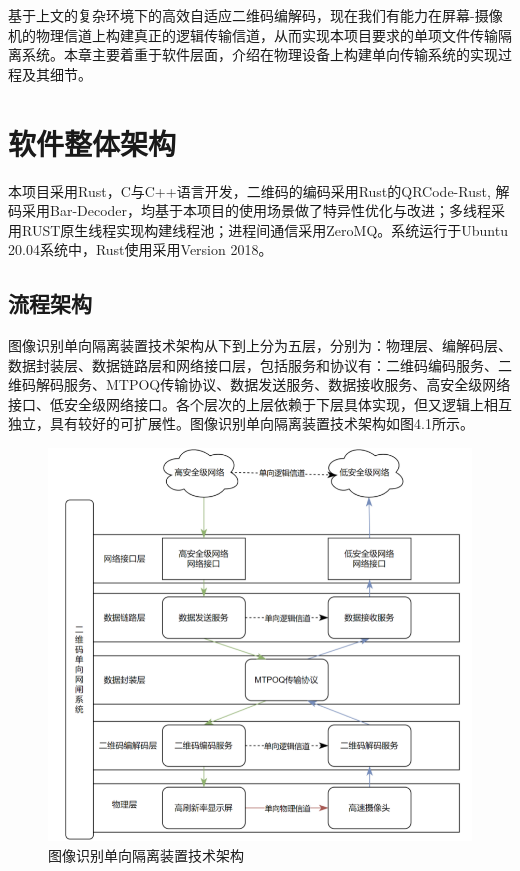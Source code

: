 \label{cha:sys}

基于上文的复杂环境下的高效自适应二维码编解码，现在我们有能力在屏幕-摄像机的物理信道上构建真正的逻辑传输信道，从而实现本项目要求的单项文件传输隔离系统。本章主要着重于软件层面，介绍在物理设备上构建单向传输系统的实现过程及其细节。

\section{软件整体架构}

本项目采用Rust，C与C++语言开发，二维码的编码采用Rust的QRCode-Rust, 解码采用Bar-Decoder，均基于本项目的使用场景做了特异性优化与改进；多线程采用RUST原生线程实现构建线程池；进程间通信采用ZeroMQ。系统运行于Ubuntu 20.04系统中，Rust使用采用Version 2018。

\subsection{流程架构}

图像识别单向隔离装置技术架构从下到上分为五层，分别为：物理层、编解码层、数据封装层、数据链路层和网络接口层，包括服务和协议有：二维码编码服务、二维码解码服务、MTPOQ传输协议、数据发送服务、数据接收服务、高安全级网络接口、低安全级网络接口。各个层次的上层依赖于下层具体实现，但又逻辑上相互独立，具有较好的可扩展性。图像识别单向隔离装置技术架构如图4.1所示。

\begin{figure}[!htbp]
\centering
\includegraphics[scale=0.6]{figures/SStructure.png}
\caption{图像识别单向隔离装置技术架构}
\end{figure}


